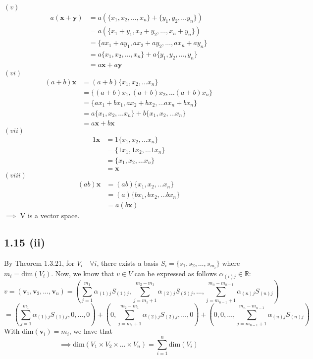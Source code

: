 \documentclass[letterpaper,12pt]{article}
\theoremstyle{definition}
\begin{document}
$(v)$\\
\begin{align*}
a(\mathbf{x}+\mathbf{y}) &= a(\{x_1, x_2, \dots, x_n\} +\{y_1, y_2,\dots y_n\}) 
\\&= a(\{x_1 + y_1,x_2 + y_2,\dots, x_n + y_n\}) 
\\&= \{ax_1 + ay_1,ax_2 + ay_2,\dots, ax_n + ay_n\} 
\\&= a\{x_1, x_2, \dots, x_n\} +a\{y_1, y_2,\dots, y_n\} 
\\&= a \mathbf{x}+ a \mathbf{y} 
\end{align*}
$(vi)$\\
\begin{align*}
    (a + b)\mathbf{x}  &= (a+b)\{x_1, x_2,\dots x_n\} 
    \\&=\{(a+b)x_1, (a+b)x_2,\dots (a+b)x_n\} 
    \\&=\{ax_1 + bx_1, ax_2+bx_2,\dots ax_n + bx_n\} 
    \\&=a\{x_1, x_2,\dots x_n\} + b\{x_1, x_2,\dots x_n\} 
    \\&=a\mathbf{x} + b\mathbf{x} 
\end{align*}
$(vii)$\\
\begin{align*}
    1\mathbf{x}&=1\{x_1, x_2,\dots x_n\} 
    \\&=\{1x_1, 1x_2,\dots 1x_n\} 
    \\&=\{x_1, x_2,\dots x_n\} 
    \\&=\mathbf{x} 
\end{align*}
$(viii)$\\
\begin{align*}
    (ab)\mathbf{x} &= (ab)\{x_1, x_2,\dots x_n\} 
    \\&= (a)\{bx_1, bx_2,\dots bx_n\} 
    \\&= a(b\mathbf{x} )
\end{align*}
$\implies$ V is a vector space.

\subsection*{1.15 (ii)}
By Theorem 1.3.21, for $V_i \quad \forall i$, there exists a basis $S_i = \{s_1, s_2,\dots, s_{m_i}\}$ where $m_i = \text{dim}(V_i)$. Now, we know that $v \in  V $ can be expressed as follows $\alpha_{(i)j} \in \mathbb{R} $:
\[v = (\mathbf{v}_1, \mathbf{v}_2, \dots, \mathbf{v}_n) = ( \sum^{m_1}_{j=1} \alpha_{(1)j} S_{(1)j},\sum^{m_2-m_1}_{j=m_1 + 1} \alpha_{(2)j} S_{(2)j}, \dots, \sum^{m_n-m_{n-1}}_{j=m_{n-1} + 1} \alpha_{(n)j} S_{(n)j}) \]
\[ = (\sum^{m_1}_{j=1} \alpha_{(1)j} S_{(1)j}, 0, \dots, 0) + (0, \sum^{m_2-m_1}_{j=m_1 + 1} \alpha_{(2)j} S_{(2)j},\dots,0) + (0, 0, \dots, \sum^{m_n-m_{n-1}}_{j=m_{n-1} + 1} \alpha_{(n)j} S_{(n)j}) \]
With $\text{dim}(\mathbf{v}_i) = m_i$, we have that
\[\implies \text{dim}(V_1 \times V_2 \times\dots\times V_n) = \sum^{n}_{i=1} \text{dim}(V_i)\]
\end{document}
